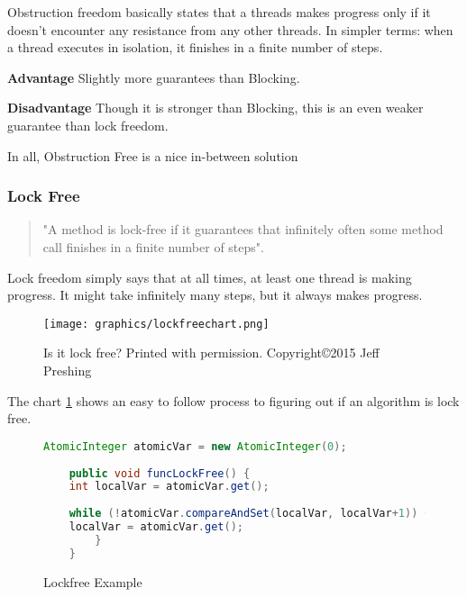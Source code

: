 \documentclass[letterpaper, 12pt]{article}
\begin{document}
Obstruction freedom basically states that a threads makes progress only if it doesn't encounter 
any resistance from any other threads. In simpler terms: when a thread executes in isolation, 
it finishes in a finite number of steps\citep{artofmulti}.

\par\vspace{\baselineskip}
{\bfseries Advantage}\newline
Slightly more guarantees than Blocking.
\par\vspace{\baselineskip}

{\bfseries Disadvantage}\newline
Though it is stronger than Blocking, this is an even weaker guarantee than lock freedom.

\par\vspace{\baselineskip}
In all, Obstruction Free is a nice in-between solution

\subsubsection{Lock Free}
\begin{quotation}
	"A method is lock-free if it guarantees that infinitely often some method call finishes 
	in a finite number of steps"\citep[p. 60]{artofmulti}.
\end{quotation}

Lock freedom simply says that at all times, at least one thread is making progress. It might 
take infinitely many steps, but it always makes progress.  

\begin{figure}
    \centering
	\texttt{[image: graphics/lockfreechart.png]}
    \caption{Is it lock free? Printed with permission. Copyright\copyright 2015 Jeff Preshing}
    \citep{introlockfree} \label{lockfreechart}
\end{figure}

The chart \ref{lockfreechart} shows an easy to follow process to figuring out if an algorithm is lock free.

\begin{figure}
	\begin{lstlisting}[language=Java]
	AtomicInteger atomicVar = new AtomicInteger(0);
	
	public void funcLockFree() {
	int localVar = atomicVar.get();
	
	while (!atomicVar.compareAndSet(localVar, localVar+1)) {
	localVar = atomicVar.get();
		}
	}
	\end{lstlisting} 
	\caption{Lockfree Example} \label{fig:lockfree_ex}
	\citep{concurrencyfreaks}
\end{figure}
\end{document}
